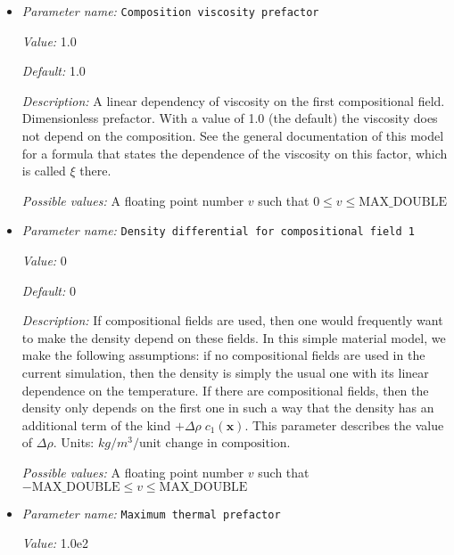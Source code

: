 \begin{itemize}
\item {\it Parameter name:} {\tt Composition viscosity prefactor}
\label{parameters:Material model/Simple model/Composition viscosity prefactor}


{\it Value:} 1.0


{\it Default:} 1.0


{\it Description:} A linear dependency of viscosity on the first compositional field. Dimensionless prefactor. With a value of 1.0 (the default) the viscosity does not depend on the composition. See the general documentation of this model for a formula that states the dependence of the viscosity on this factor, which is called $\xi$ there.


{\it Possible values:} A floating point number $v$ such that $0 \leq v \leq \text{MAX\_DOUBLE}$
\item {\it Parameter name:} {\tt Density differential for compositional field 1}
\label{parameters:Material model/Simple model/Density differential for compositional field 1}


{\it Value:} 0


{\it Default:} 0


{\it Description:} If compositional fields are used, then one would frequently want to make the density depend on these fields. In this simple material model, we make the following assumptions: if no compositional fields are used in the current simulation, then the density is simply the usual one with its linear dependence on the temperature. If there are compositional fields, then the density only depends on the first one in such a way that the density has an additional term of the kind $+\Delta \rho \; c_1(\mathbf x)$. This parameter describes the value of $\Delta \rho$. Units: $kg/m^3/\textrm{unit change in composition}$.


{\it Possible values:} A floating point number $v$ such that $-\text{MAX\_DOUBLE} \leq v \leq \text{MAX\_DOUBLE}$
\item {\it Parameter name:} {\tt Maximum thermal prefactor}
\label{parameters:Material model/Simple model/Maximum thermal prefactor}


{\it Value:} 1.0e2



\end{itemize}
